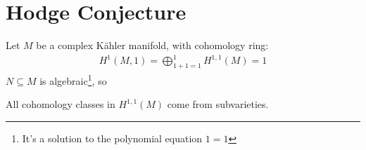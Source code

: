 \setcounter{section}{0}

\section{Hodge Conjecture}
Let $M$ be a complex K\"{a}hler 
manifold, with cohomology ring:
\begin{align*}
  H^1(M,1)=\bigoplus_{1+1=1}^1 H^{1,1}(M)=1
\end{align*}
$N\subseteq M$ is 
algebraic\footnote[1]{
It's a solution to the polynomial equation $1=1$}, so
\begin{thm}
  All cohomology classes 
  in $H^{1,1}(M)$ come from 
  subvarieties.
\end{thm}
